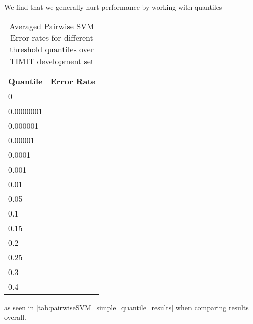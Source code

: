 \documentclass{article}
\begin{document}
We find that we generally hurt performance by working with quantiles
\begin{table}[h]
  \centering
  \begin{tabular}{| l |  r |}
    \hline
     Quantile & Error Rate \\ \hline\hline
0 &  \\ \hline
0.0000001 &  \\ \hline
0.000001 &  \\ \hline
0.00001 &  \\ \hline
0.0001 &  \\ \hline

0.001 &  \\ \hline
0.01 &  \\ \hline
0.05 &  \\ \hline
0.1 &  \\ \hline
0.15 &  \\ \hline
0.2 &  \\ \hline
0.25 &  \\ \hline
0.3 &  \\ \hline
0.4 &  \\ \hline
  \end{tabular}
  \caption{Averaged Pairwise SVM Error rates for different threshold quantiles over TIMIT development set}
  \label{tab:pairwiseSVM_simple_quantile_results}
\end{table}
as seen in \autoref{tab:pairwiseSVM_simple_quantile_results} when comparing results overall.  
\end{document}

